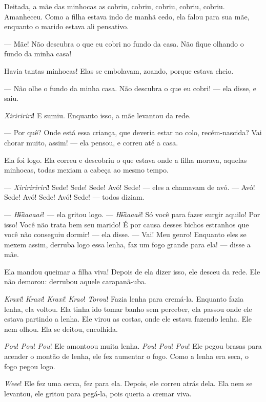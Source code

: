 Deitada, a mãe das minhocas as cobriu, cobriu, cobriu, cobriu, cobriu.
Amanheceu. Como a filha estava indo de manhã cedo, ela falou para sua
mãe, enquanto o marido estava ali pensativo.

--- Mãe! Não descubra o que eu cobri no fundo da casa. Não fique olhando
o fundo da minha casa! 

Havia tantas minhocas! Elas se embolavam, zoando, porque estava cheio. 

--- Não olhe o fundo da minha casa. Não descubra o que eu cobri! --- ela
disse, e saiu. 

\textit{Xiriririri}! E sumiu. Enquanto isso, a mãe levantou da rede. 

--- Por quê? Onde está essa criança, que deveria estar no colo,
 recém-nascida? Vai chorar muito, assim! --- ela pensou, e correu até a
 casa.

Ela foi logo. Ela correu e descobriu o que estava onde a filha morava,
 aquelas minhocas, todas mexiam a cabeça ao mesmo tempo. 

--- \textit{Xiririririri}! Sede! Sede! Sede! Avó! Sede! --- eles a chamavam de
 avó. --- Avó! Sede! Avó! Sede! Avó! Sede! --- todos diziam. 

--- \textit{Hɨ̃ãaaaaë}! --- ela gritou logo. --- \textit{Hɨ̃ãaaaë}! Só você para fazer surgir
 aquilo! Por isso! Você não trata bem seu marido! É por causa desses
 bichos estranhos que você não conseguiu dormir! --- ela disse. --- Vai! Meu
 genro! Enquanto eles se mexem assim, derruba logo essa lenha, faz um fogo
 grande para ela! --- disse a mãe. 

Ela mandou queimar a filha viva! Depois de ela dizer isso, ele desceu da
rede. Ele não demorou: derrubou aquele carapanã-uba.

\textit{Kraxi}! \textit{Kraxi}! \textit{Kraxi}! \textit{Krao}! \textit{Torou}! Fazia lenha para cremá-la. Enquanto
 fazia lenha, ela voltou. Ela tinha ido tomar banho sem perceber, ela passou
 onde ele estava partindo a lenha. Ele virou as costas, onde ele estava fazendo
 lenha. Ele nem olhou. Ela se deitou, encolhida. 

\textit{Pou}! \textit{Pou}! \textit{Pou}! Ele amontoou muita lenha. \textit{Pou}! \textit{Pou}! \textit{Pou}! Ele pegou
brasas para acender o montão de lenha, ele fez aumentar o fogo. Como a
lenha era seca, o fogo pegou logo. 

\textit{Weee}! Ele fez uma cerca, fez para ela. Depois, ele correu atrás dela.
Ela nem se levantou, ele gritou para pegá-la, pois queria a cremar viva. 

